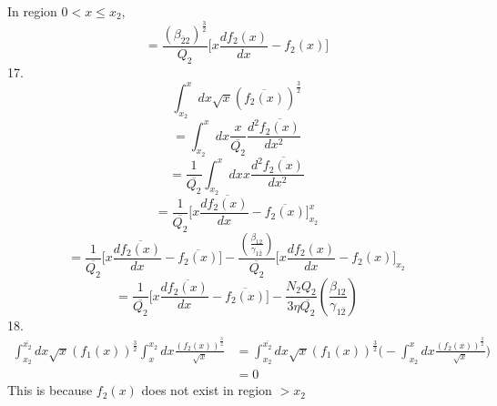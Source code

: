 \documentclass[fleqn, 10pt]{article}
\begin{document}
                In region $0<x\leq x_{2}$, 
                \begin{equation}
                    = \frac{(\beta_{\overline{2}2})^\frac{3}{2}}{Q_{2}} \Biggl[x \frac{df_{2}(x)}{dx} - f_{2}(x) \Biggr]
                    \label{78}
                \end{equation}
17. 
\begin{equation*}
   \int^{x}_{x_{2}} dx \sqrt{x} (\overline{f_{2}(x)})^\frac{3}{2}
\end{equation*}
\begin{equation*}
   = \int^{x}_{x_{2}} dx \frac{x}{\overline{Q_{2}}} \frac{d^2\overline{f_{2}(x)}}{dx^2}
\end{equation*}
\begin{equation*}
    = \frac{1}{\overline{Q_{2}}} \int^{x}_{x_{2}} dx x \frac{d^2\overline{f_{2}(x)}}{dx^2}
\end{equation*}
\begin{equation*}
    = \frac{1}{\overline{Q_{2}}} \biggl[ x \frac{d\overline{f_{2}(x)}}{dx} - \overline{f_{2}(x)} \biggr]^{x}_{x_{2}}
\end{equation*}
\begin{equation*}
    = \frac{1}{\overline{Q_{2}}} \biggl[ x \frac{d\overline{f_{2}(x)}}{dx} - \overline{f_{2}(x)} \biggr] - \frac{\left(\frac{\beta_{12}}{\gamma_{1\overline{2}}}\right)}{\overline{Q_{2}}} \biggl[ x \frac{df_{2}(x)}{dx} - f_{2}(x) \biggr]_{x_{2}} 
\end{equation*}
\begin{equation}
  = \frac{1}{\overline{Q_{2}}} \biggl[ x \frac{d\overline{f_{2}(x)}}{dx} - \overline{f_{2}(x)} \biggr] - \frac{N_{2}Q_{2}}{3\eta \overline{Q_{2}}}\left(\frac{\beta_{12}}{\gamma_{1\overline{2}}}\right)
    \label{56}
\end{equation}
 18. 
                \begin{equation}
                    \begin{split}
                        \int^{\overline{x_{2}}}_{x_{2}} dx \sqrt{x} (f_1(x))^\frac{3}{2} \int^{x_{2}}_{x} dx \frac{(f_2(x))^\frac{3}{2}}{\sqrt{x}} & = \int^{\overline{x_{2}}}_{x_{2}} dx \sqrt{x} (f_1(x))^\frac{3}{2} \biggl( - \int^{x}_{x_{2}} dx \frac{(f_2(x))^\frac{3}{2}}{\sqrt{x}} \biggr)  \\ & = 0
                    \end{split}
                    \label{76}
                \end{equation}
                This is because $f_{2}(x)$ does not exist in region $> x_{2}$ \\
\end{document}
